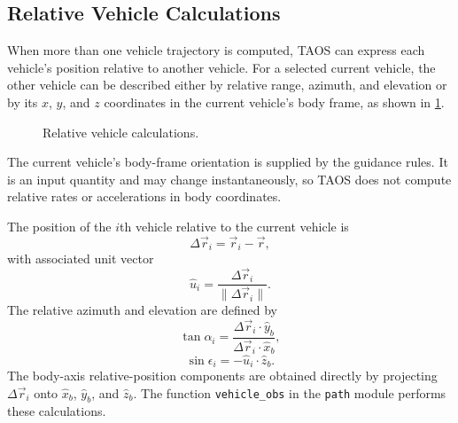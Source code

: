 \subsection{Relative Vehicle Calculations}\label{sec:relative-vehicle}

When more than one vehicle trajectory is computed, TAOS can express each vehicle's
position relative to another vehicle. For a selected current vehicle, the other
vehicle can be described either by relative range, azimuth, and elevation or by its
$x$, $y$, and $z$ coordinates in the current vehicle's body frame, as shown in
\cref{fig:relative-vehicle-calculations}.

\begin{figure}[htbp]
  \centering
  \resizebox{0.73\linewidth}{!}{}
  \caption{Relative vehicle calculations.}
  \label{fig:relative-vehicle-calculations}
\end{figure}

The current vehicle's body-frame orientation is supplied by the guidance rules. It is
an input quantity and may change instantaneously, so TAOS does not compute relative
rates or accelerations in body coordinates.

The position of the $i$th vehicle relative to the current vehicle is
\begin{equation}
  \Delta\vec r_i=\vec r_i-\vec r,
  \label{eq:relative-vehicle-position}
\end{equation}
with associated unit vector
\begin{equation}
  \hat u_i=\frac{\Delta\vec r_i}{\lVert\Delta\vec r_i\rVert}.
  \label{eq:relative-vehicle-unit-vector}
\end{equation}
The relative azimuth and elevation are defined by
\begin{equation}
  \tan\alpha_i
  =\frac{\Delta\vec r_i\cdot\hat y_b}
         {\Delta\vec r_i\cdot\hat x_b},
  \label{eq:relative-vehicle-azimuth}
\end{equation}
\begin{equation}
  \sin\epsilon_i=-\hat u_i\cdot\hat z_b.
  \label{eq:relative-vehicle-elevation}
\end{equation}
The body-axis relative-position components are obtained directly by projecting
$\Delta\vec r_i$ onto $\hat x_b$, $\hat y_b$, and $\hat z_b$. The function
\texttt{vehicle\_obs} in the \texttt{path} module performs these calculations.
